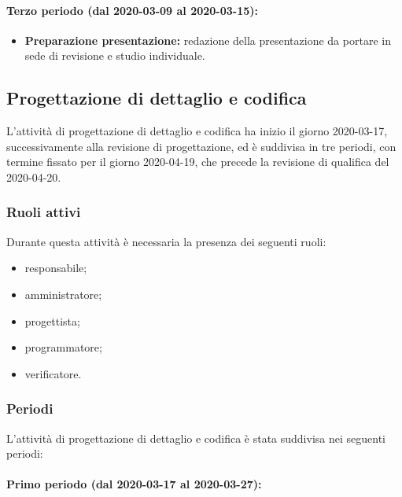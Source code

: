 				\paragraph{Terzo periodo (dal 2020-03-09 al 2020-03-15):}
				
					\begin{itemize}
						\item \textbf{Preparazione presentazione:} redazione della presentazione da portare in sede di revisione e studio individuale.
					\end{itemize}

		\subsection{Progettazione di dettaglio e codifica}
			
			L'attività di progettazione di dettaglio e codifica ha inizio il giorno 2020-03-17, successivamente alla revisione di progettazione, ed è suddivisa in tre periodi, con termine fissato per il giorno 2020-04-19, che precede la revisione di qualifica del 2020-04-20.
			
			\subsubsection{Ruoli attivi}
			
				Durante questa attività è necessaria la presenza dei seguenti ruoli:
				\begin{itemize}
					\item responsabile;
					\item amministratore;
					\item progettista;
					\item programmatore;
					\item verificatore.
				\end{itemize}
			
			\subsubsection{Periodi}
			
				L'attività di progettazione di dettaglio e codifica è stata suddivisa nei seguenti periodi:
				
				\paragraph{Primo periodo (dal 2020-03-17 al 2020-03-27):}
				
